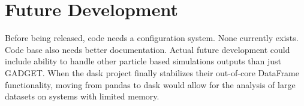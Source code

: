 \section{Future Development}
\label{future}
Before being released, code needs a configuration system.  None currently exists.  Code base also needs better documentation.  Actual future development could include ability to handle other particle based simulations outputs than just GADGET.  When the dask project finally stabilizes their out-of-core DataFrame functionality, moving from pandas to dask would allow for the analysis of large datasets on systems with limited memory.